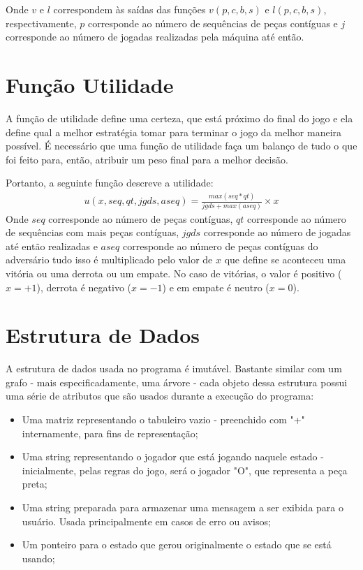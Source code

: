 \documentclass{article}
\begin{document}
    Onde $v$ e $l$ correspondem às saídas das funções $v(p, c, b, s)$ e $l(p,
    c, b, s)$, respectivamente, $p$ corresponde ao número de sequências de
    peças contíguas e $j$ corresponde ao número de jogadas realizadas pela
    máquina até então.
    
\section*{Função Utilidade}
    A função de utilidade define uma certeza, que está próximo do final do jogo
    e ela define qual a melhor estratégia tomar para terminar o jogo da melhor
    maneira possível. É necessário que uma função de utilidade faça um balanço
    de tudo o que foi feito para, então, atribuir um peso final para a melhor
    decisão.
    
    Portanto, a seguinte função descreve a utilidade:
    \begin{gather*}
        u(x, seq, qt, jgds, aseq) = \frac{max(seq * qt)}{jgds + max(aseq)}
        \times x
    \end{gather*}
    Onde $seq$ corresponde ao número de peças contíguas, $qt$ corresponde ao
    número de sequências com mais peças contíguas, $jgds$ corresponde ao número
    de jogadas até então realizadas e $aseq$ corresponde ao número de peças
    contíguas do adversário tudo isso é multiplicado pelo valor de $x$ que
    define se aconteceu uma vitória ou uma derrota ou um empate. No caso de
    vitórias, o valor é positivo ($x = +1$), derrota é negativo ($x = -1$) e em
    empate é neutro ($x = 0$).
    
\section*{Estrutura de Dados}
    A estrutura de dados usada no programa é imutável. Bastante similar com um
    grafo - mais especificadamente, uma árvore - cada objeto dessa estrutura
    possui uma série de atributos que são usados durante a execução do
    programa:
    
    \begin{itemize}
        \item Uma matriz representando o tabuleiro vazio - preenchido com "+"
            internamente, para fins de representação;
        \item Uma string representando o jogador que está jogando naquele
            estado - inicialmente, pelas regras do jogo, será o jogador "O",
            que representa a peça preta;
        \item Uma string preparada para armazenar uma mensagem a ser exibida
            para o usuário. Usada principalmente em casos de erro ou avisos;
        \item Um ponteiro para o estado que gerou originalmente o estado que se
            está usando;
    \end{itemize}
    
\end{document}
